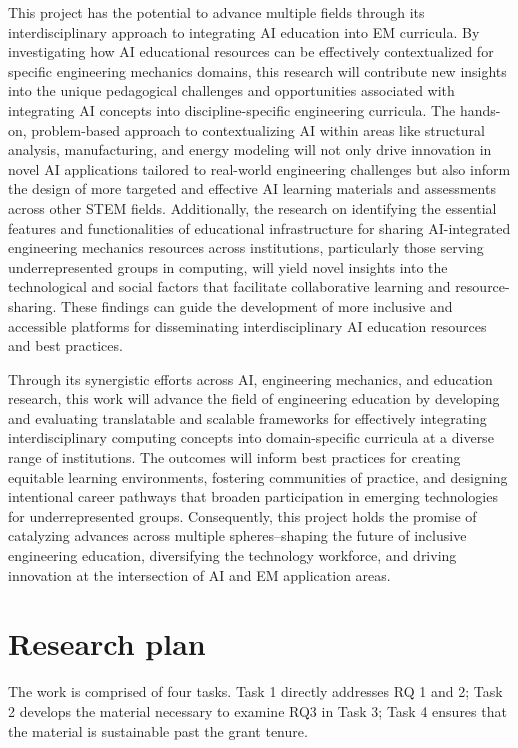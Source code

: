 \documentclass[11pt]{article}
\begin{document}
This project has the potential to advance multiple fields through its interdisciplinary approach to integrating AI education into EM curricula. 
By investigating how AI educational resources can be effectively contextualized for specific engineering mechanics domains, this research will contribute new insights into the unique pedagogical challenges and opportunities associated with integrating AI concepts into discipline-specific engineering curricula. 
The hands-on, problem-based approach to contextualizing AI within areas like structural analysis, manufacturing, and energy modeling will not only drive innovation in novel AI applications tailored to real-world engineering challenges but also inform the design of more targeted and effective AI learning materials and assessments across other STEM fields.
Additionally, the research on identifying the essential features and functionalities of educational infrastructure for sharing AI-integrated engineering mechanics resources across institutions, particularly those serving underrepresented groups in computing, will yield novel insights into the technological and social factors that facilitate collaborative learning and resource-sharing. 
These findings can guide the development of more inclusive and accessible platforms for disseminating interdisciplinary AI education resources and best practices.

Through its synergistic efforts across AI, engineering mechanics, and education research, this work will advance the field of engineering education by developing and evaluating translatable and scalable frameworks for effectively integrating interdisciplinary computing concepts into domain-specific curricula at a diverse range of institutions. 
The outcomes will inform best practices for creating equitable learning environments, fostering communities of practice, and designing intentional career pathways that broaden participation in emerging technologies for underrepresented groups.
Consequently, this project holds the promise of catalyzing advances across multiple spheres--shaping the future of inclusive engineering education, diversifying the technology workforce, and driving innovation at the intersection of AI and EM application areas.


\section{Research plan} The work is comprised of four tasks.
Task 1 directly addresses RQ 1 and 2; Task 2 develops the material necessary to examine RQ3 in Task 3; Task 4 ensures that the material is sustainable past the grant tenure.
\end{document}
